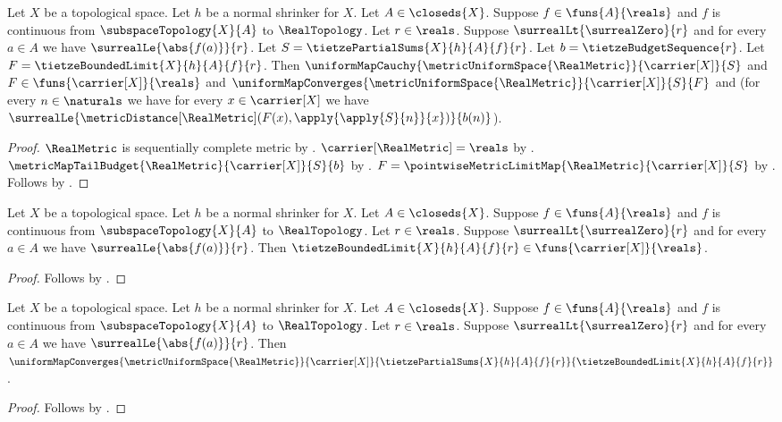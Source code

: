 \begin{theorem}\label{tietze_bounded_limit_data}
    Let $X$ be a topological space.
    Let $h$ be a normal shrinker for $X$.
    Let $A\in\closeds{X}$.
    Suppose $f\in\funs{A}{\reals}$ and $f$ is continuous from
        $\subspaceTopology{X}{A}$ to $\RealTopology$.
    Let $r\in\reals$.
    Suppose $\surrealLt{\surrealZero}{r}$ and
        for every $a\in A$ we have $\surrealLe{\abs{f(a)}}{r}$.
    Let $S=\tietzePartialSums{X}{h}{A}{f}{r}$.
    Let $b=\tietzeBudgetSequence{r}$.
    Let $F=\tietzeBoundedLimit{X}{h}{A}{f}{r}$.
    Then $\uniformMapCauchy{\metricUniformSpace{\RealMetric}}
            {\carrier[X]}{S}$ and
        $F\in\funs{\carrier[X]}{\reals}$ and
        $\uniformMapConverges{\metricUniformSpace{\RealMetric}}
            {\carrier[X]}{S}{F}$ and
        (for every $n\in\naturals$ we have for every
            $x\in\carrier[X]$ we have
            $\surrealLe{\metricDistance[\RealMetric]
                (F(x),\apply{\apply{S}{n}}{x})}{b(n)}$).
\end{theorem}
\begin{proof}
    $\RealMetric$ is sequentially complete metric
        by .
    $\carrier[\RealMetric]=\reals$
        by .
    $\metricMapTailBudget{\RealMetric}{\carrier[X]}{S}{b}$
        by .
    $F=\pointwiseMetricLimitMap{\RealMetric}{\carrier[X]}{S}$
        by .
    Follows by .
\end{proof}

\begin{corollary}\label{tietze_bounded_limit_typed}
    Let $X$ be a topological space.
    Let $h$ be a normal shrinker for $X$.
    Let $A\in\closeds{X}$.
    Suppose $f\in\funs{A}{\reals}$ and $f$ is continuous from
        $\subspaceTopology{X}{A}$ to $\RealTopology$.
    Let $r\in\reals$.
    Suppose $\surrealLt{\surrealZero}{r}$ and
        for every $a\in A$ we have $\surrealLe{\abs{f(a)}}{r}$.
    Then $\tietzeBoundedLimit{X}{h}{A}{f}{r}
        \in\funs{\carrier[X]}{\reals}$.
\end{corollary}
\begin{proof}
    Follows by .
\end{proof}

\begin{corollary}\label{tietze_partial_sums_converge_uniformly}
    Let $X$ be a topological space.
    Let $h$ be a normal shrinker for $X$.
    Let $A\in\closeds{X}$.
    Suppose $f\in\funs{A}{\reals}$ and $f$ is continuous from
        $\subspaceTopology{X}{A}$ to $\RealTopology$.
    Let $r\in\reals$.
    Suppose $\surrealLt{\surrealZero}{r}$ and
        for every $a\in A$ we have $\surrealLe{\abs{f(a)}}{r}$.
    Then
        $\uniformMapConverges{\metricUniformSpace{\RealMetric}}
            {\carrier[X]}{\tietzePartialSums{X}{h}{A}{f}{r}}
            {\tietzeBoundedLimit{X}{h}{A}{f}{r}}$.
\end{corollary}
\begin{proof}
    Follows by .
\end{proof}

